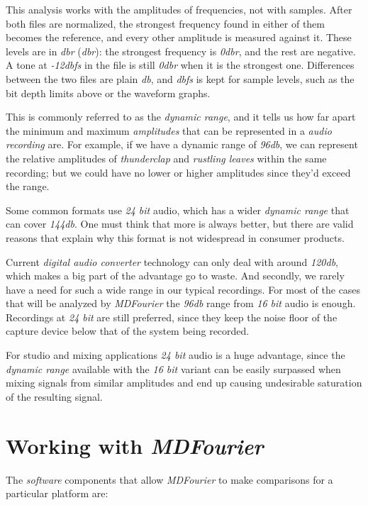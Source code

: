 \documentclass[10pt,a4paper]{report}
\newcommand{\define}[1]{\textit{\acrlong{#1}} (\textit{\acrshort{#1}})}
\newcommand{\ac}[1]{\textit{\mbox{\acrshort{#1}}}}
\newcommand{\dbfs}[1]{\textit{\mbox{#1\acrshort{dbfs}}}}
\newcommand{\dbr}[1]{\textit{\mbox{#1\acrshort{dbr}}}}
\newcommand{\dbSPL}[1]{\textit{\mbox{#1\acrshort{db}}}}
\begin{document}
This analysis works with the amplitudes of frequencies, not with samples. After both files are normalized, the strongest frequency found in either of them becomes the reference, and every other amplitude is measured against it. These levels are in \define{dbr}:\cite{decibelsuffixes} the strongest frequency is \dbr{0}, and the rest are negative. A tone at \dbfs{-12} in the file is still \dbr{0} when it is the strongest one. Differences between the two files are plain \ac{db}, and \ac{dbfs} is kept for sample levels, such as the bit depth limits above or the waveform graphs.

This is commonly referred to as the \textit{dynamic range}, and it tells us how far apart the minimum and maximum \textit{amplitudes} that can be represented in a \textit{audio recording} are. For example, if we have a dynamic range of \dbSPL{96}, we can represent the relative amplitudes of \textit{thunderclap} and \textit{rustling leaves} within the same recording; but we could have no lower or higher amplitudes since they'd exceed the range.

Some common formats use \textit{24 bit} audio, which has a wider \textit{dynamic range} that can cover \dbSPL{144}. One must think that more is always better, but there are valid reasons that explain why this format is not widespread in consumer products.

Current \textit{digital audio converter} technology can only deal with around \dbSPL{120}, which makes a big part of the advantage go to waste. And secondly, we rarely have a need for such a wide range in our typical recordings. For most of the cases that will be analyzed by \textit{MDFourier} the \dbSPL{96} range from \textit{16 bit} audio is enough. Recordings at \textit{24 bit} are still preferred, since they keep the noise floor of the capture device below that of the system being recorded.

For studio and mixing applications \textit{24 bit} audio is a huge advantage, since the \textit{dynamic range} available with the \textit{16 bit} variant can be easily surpassed when mixing signals from similar amplitudes and end up causing undesirable saturation of the resulting signal.


\chapter{Working with \textit{MDFourier}}
\label{workflow}

The \textit{software} components that allow \textit{MDFourier} to make comparisons for a particular platform are:
\end{document}
